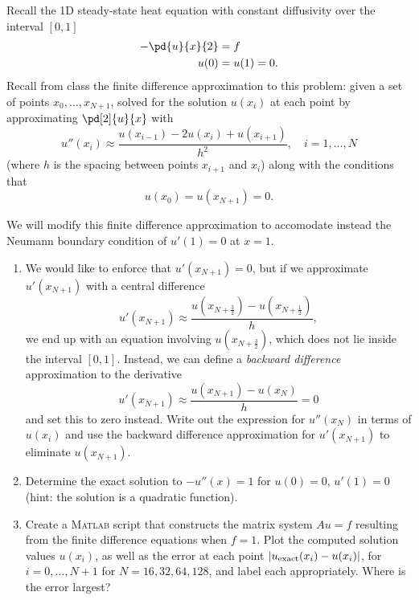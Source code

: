 Recall the 1D steady-state heat equation with constant diffusivity over the interval $[0,1]$
\begin{align*}
-\pd{u}{x}{2} &= f\\
u(0) &= u(1) = 0.
\end{align*}
Recall from class the finite difference approximation to this problem: given a set of points $x_0,\ldots, x_{N+1}$, solved for the solution $u(x_i)$ at each point by approximating $\pd[2]{u}{x}$ with
\[
u''({x_i}) \approx \frac{u(x_{i-1}) - 2u(x_i) + u(x_{i+1})}{h^2}, \quad i = 1,\ldots, N
\]
(where $h$ is the spacing between points $x_{i+1}$ and $x_i$) along with the conditions that
\[
u(x_0) = u(x_{N+1}) = 0.
\]

We will modify this finite difference approximation to accomodate instead the Neumann boundary condition of $u'(1) = 0$ at $x=1$.
\begin{enumerate}
\item We would like to enforce that $u'(x_{N+1}) = 0$, but if we approximate $u'(x_{N+1})$ with a central difference
\[
u'(x_{N+1}) \approx \frac{u(x_{N+\frac{3}{2}})-u(x_{N+\frac{1}{2}})}{h},
\]
we end up with an equation involving $u(x_{N+\frac{3}{2}})$, which does not lie inside the interval $[0,1]$. Instead, we can define a \textit{backward difference} approximation to the derivative
\[
u'(x_{N+1}) \approx \frac{u(x_{N+1})-u(x_N)}{h} = 0
\]
and set this to zero instead. Write out the expression for $u''(x_N)$ in terms of $u(x_i)$ and use the backward difference approximation for $u'(x_{N+1})$ to eliminate $u(x_{N+1})$.
\item Determine the exact solution to $-u''(x) = 1$ for $u(0) = 0$, $u'(1) = 0$ (hint: the solution is a quadratic function).
\item Create a \textsc{Matlab} script that constructs the matrix system $Au = f$ resulting from the finite difference equations when $f = 1$.  Plot the computed solution values $u(x_i)$, as well as the error at each point $|u_{\rm exact}(x_i)-u(x_i)|$, for $i = 0,\ldots, N+1$ for $N = 16, 32, 64, 128$, and label each appropriately.  Where is the error largest?
\end{enumerate}


